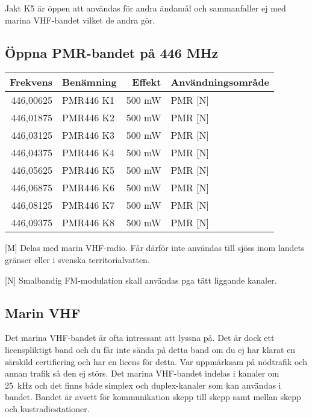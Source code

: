 Jakt K5 är öppen att användas för andra ändamål och sammanfaller ej med marina VHF-bandet vilket de andra gör.


\subsection{Öppna PMR-bandet på 446 MHz}
\begin{tabular}{rlrl}
	\textbf{Frekvens} & \textbf{Benämning} & \textbf{Effekt} & \textbf{Användningsområde} \\ \hline
	        446,00625 & PMR446 K1          &          500 mW & PMR [N]                    \\
	        446,01875 & PMR446 K2          &          500 mW & PMR [N]                    \\
	        446,03125 & PMR446 K3          &          500 mW & PMR [N]                    \\
	        446,04375 & PMR446 K4          &          500 mW & PMR [N]                    \\
	        446,05625 & PMR446 K5          &          500 mW & PMR [N]                    \\
	        446,06875 & PMR446 K6          &          500 mW & PMR [N]                    \\
	        446,08125 & PMR446 K7          &          500 mW & PMR [N]                    \\
	        446,09375 & PMR446 K8          &          500 mW & PMR [N]
\end{tabular}

[M] Delas med marin VHF-radio. Får därför inte användas till sjöss inom landets gränser eller i svenska territorialvatten.

[N] Smalbandig FM-modulation skall användas pga tätt liggande kanaler.

\subsection{Marin VHF}

Det marina VHF-bandet är ofta intressant att lyssna på. Det är dock ett licenspliktigt band och du får inte sända på detta band om du ej har klarat en särskild certifiering och har en licens för detta. Var uppmärksam på nödtrafik och annan trafik så den ej störs. Det marina VHF-bandet indelas i kanaler om 25~kHz och det finns både simplex och duplex-kanaler som kan användas i bandet. Bandet är avsett för kommunikation skepp till skepp samt mellan skepp och kustradiostationer.


